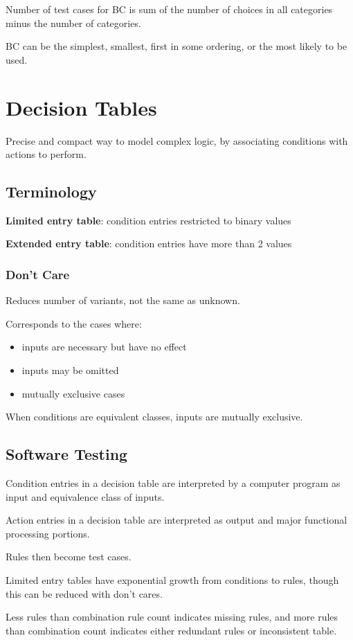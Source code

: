 \documentclass[11pt]{article}
\begin{document}
Number of test cases for BC is sum of the number of choices in all categories minus
the number of categories.

BC can be the simplest, smallest, first in some ordering, or the most likely to be used.
\section{Decision Tables}
\label{sec:org0b3782d}
Precise and compact way to model complex logic, by associating conditions with actions
to perform.
\subsection{Terminology}
\label{sec:org1a83c8a}
\textbf{Limited entry table}: condition entries restricted to binary values

\textbf{Extended entry table}: condition entries have more than 2 values
\subsubsection{Don't Care}
\label{sec:org8a5103a}
Reduces number of variants, not the same as unknown.

Corresponds to the cases where:
\begin{itemize}
\item inputs are necessary but have no effect
\item inputs may be omitted
\item mutually exclusive cases
\end{itemize}

When conditions are equivalent classes, inputs are mutually exclusive.
\subsection{Software Testing}
\label{sec:org172ed9a}
Condition entries in a decision table are interpreted by a computer program as
input and equivalence class of inputs.

Action entries in a decision table are interpreted as output and major functional
processing portions.

Rules then become test cases.

Limited entry tables have exponential growth from conditions to rules, though this
can be reduced with don't cares.

Less rules than combination rule count indicates missing rules, and more rules
than combination count indicates either redundant rules or inconsistent table.
\end{document}
